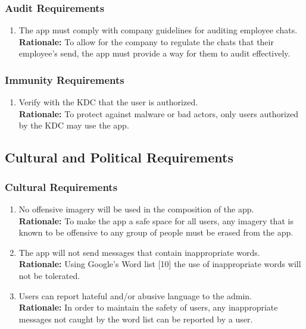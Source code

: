 \documentclass[]{article}
\begin{document}
\subsubsection{Audit Requirements}
\label{ssub:audit_requirements}
\begin{enumerate}[{SR-AU}1. ]
	\item The app must comply with company guidelines for auditing employee chats.
	      \\\textbf{Rationale:} To allow for the company to regulate the chats that their employee’s send, the app must provide a way for them to audit effectively.
\end{enumerate}

\subsubsection{Immunity Requirements}
\label{ssub:immunity_requirements}
\begin{enumerate}[{SR-IM}1. ]
	\item Verify with the KDC that the user is authorized.
	      \\\textbf{Rationale:} To protect against malware or bad actors, only users authorized by the KDC may use the app.
\end{enumerate}


\subsection{Cultural and Political Requirements}
\label{sub:cultural_and_political_requirements}

\subsubsection{Cultural Requirements}
\label{ssub:cultural_requirements}
\begin{enumerate}[{CP-C}1. ]
	\item No offensive imagery will be used in the composition of the app.
	      \\\textbf{Rationale:} To make the app a safe space for all users, any imagery that is known to be offensive to any group of people must be erased from the app.
	\item The app will not send messages that contain inappropriate words.
	      \\\textbf{Rationale:} Using Google’s Word list [10] the use of inappropriate words will not be tolerated.
	\item Users can report hateful and/or abusive language to the admin.
	      \\\textbf{Rationale:} In order to maintain the safety of users, any inappropriate messages not caught by the word list can be reported by a user.

\end{enumerate}
\end{document}
